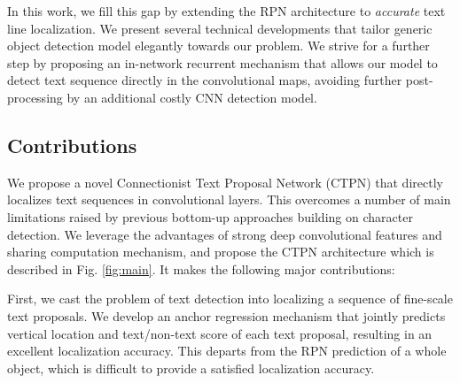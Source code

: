 \documentclass[runningheads]{llncs}
\begin{document}
In this work, we fill this gap by extending the RPN architecture \cite{Ren2015} to \textit{accurate} text line localization.  We present several technical developments that tailor generic object detection model elegantly towards our problem. We strive for a further step by proposing an in-network recurrent mechanism that allows our model to detect text sequence  directly in the convolutional maps, avoiding further post-processing by an additional costly CNN detection model.





\subsection{Contributions}
We  propose  a novel Connectionist Text Proposal Network (CTPN) that directly localizes text sequences in  convolutional layers.
This overcomes a number of main limitations raised by previous bottom-up approaches building on character detection. We leverage the advantages of  strong deep convolutional features and sharing computation mechanism, and propose the CTPN architecture which is described in Fig. \ref{fig:main}. It makes the following major contributions:


First, we cast the problem of text detection into localizing a sequence of fine-scale text proposals. We develop an anchor  regression mechanism that jointly predicts  vertical location and text/non-text score of each text proposal, resulting in  an excellent localization accuracy. This departs from the RPN prediction of a whole object, which is difficult to provide a satisfied localization accuracy.
\end{document}
